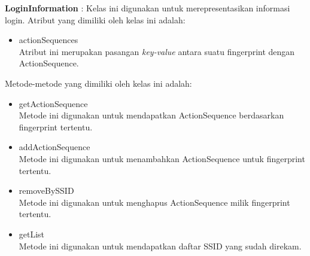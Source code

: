 \documentclass[a4paper,twoside]{article}
\begin{document}
\begin{enumerate}
\begin{itemize}
{                \textbf{LoginInformation} : Kelas ini digunakan untuk merepresentasikan informasi login. Atribut yang dimiliki oleh kelas ini adalah:
                \begin{itemize}
                    \item{actionSequences\\Atribut ini merupakan pasangan \textit{key-value} antara suatu fingerprint dengan ActionSequence.}
                \end{itemize}
                Metode-metode yang dimiliki oleh kelas ini adalah:
                \begin{itemize}
                    \item{getActionSequence\\Metode ini digunakan untuk mendapatkan ActionSequence berdasarkan fingerprint tertentu.}
                    \item{addActionSequence\\Metode ini digunakan untuk menambahkan ActionSequence untuk fingerprint tertentu.}
                    \item{removeBySSID\\Metode ini digunakan untuk menghapus ActionSequence milik fingerprint tertentu.}
                    \item{getList\\Metode ini digunakan untuk mendapatkan daftar SSID yang sudah direkam.}
                \end{itemize}
                
}
\end{itemize}
\end{enumerate}
\end{document}
